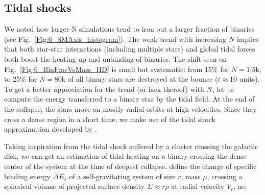 \subsection{Tidal shocks} 


We noted how larger-N simulations tend to iron out a larger fraction of binaries (see Fig.~\ref{Fig:6_SMAxis_histogram}). 
The weak trend with increasing $N$ implies that both star-star interactions (including multiple stars) and global tidal forces both boost the heating up and unbinding of  binaries.  The shift seen on Fig.~\ref{Fig:6_BinFracVsMass_HD} is small but systematic: from 15\% for $N = 1.5$k, to 25\% for $N = 80$k of all binary stars are destroyed at the bounce ($t \approx 10 $ units).  To get a better appreciation for the trend (or lack thereof) with $N$, let us compute the energy transferred to a binary star by the tidal field. At the end of the collapse, the stars move on mostly radial orbits at high velocities. Since they cross a dense region in a short time, we make use of the tidal shock approximation developed by \citet[see also \citealt{Boily2004,BT}]{Spitzer1958}.


Taking inspiration from the tidal shock suffered  by a cluster crossing the galactic disk, we can get an estimation of tidal heating on a binary crossing the dense center of the system at the time of deepest collapse. \cite{BT} define the change of specific binding  energy $\Delta E_s $ of a self-gravitating system of size $r$, mass $\mu$, crossing a spherical volume of projected surface density $\Sigma \approx r \rho$ at radial velocity $V_r$, as:

